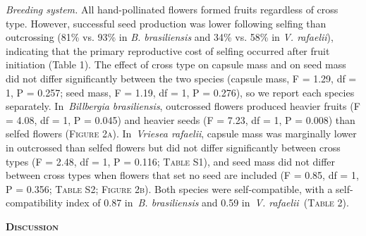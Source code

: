 \documentclass[
]{article}
\begin{document}
\emph{Breeding system.} All hand-pollinated flowers formed fruits
regardless of cross type. However, successful seed production was lower
following selfing than outcrossing (81\% vs. 93\% in \emph{B.
brasiliensis} and 34\% vs. 58\% in \emph{V. rafaelii}), indicating that
the primary reproductive cost of selfing occurred after fruit initiation
(Table 1). The effect of cross type on capsule mass and on seed mass did
not differ significantly between the two species (capsule mass, F =
1.29, df = 1, P = 0.257; seed mass, F = 1.19, df = 1, P = 0.276), so we
report each species separately. In~\emph{Billbergia brasiliensis},
outcrossed flowers produced heavier fruits (F = 4.08, df = 1, P = 0.045)
and heavier seeds (F = 7.23, df = 1, P = 0.008) than selfed flowers
(\textsc{Figure 2a}). In~\emph{Vriesea rafaelii}, capsule mass was
marginally lower in outcrossed than selfed flowers but did not differ
significantly between cross types (F = 2.48, df = 1, P = 0.116;
\textsc{Table S1}), and seed mass did not differ between cross types
when flowers that set no seed are included (F = 0.85, df = 1, P = 0.356;
\textsc{Table S2}; \textsc{Figure 2b}). Both species were
self-compatible, with a self-compatibility index of 0.87 in~\emph{B.
brasiliensis} and 0.59 in~\emph{V. rafaelii}~(\textsc{Table 2}).

\textbf{\textsc{Discussion}}
\end{document}
